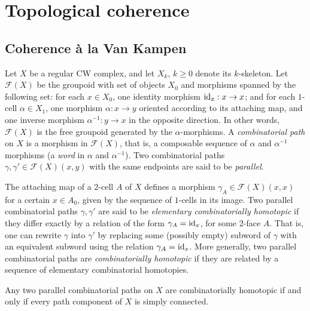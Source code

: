 
\section{Topological coherence} 
\label{s:polycoherence}

\subsection{Coherence \`a la Van Kampen}

Let $X$ be a regular CW complex, and let $X_k$, $k\geq 0$ denote its $k$-skeleton. 
Let $\mathcal{F}(X)$ be the groupoid with set of objects $X_0$ and morphisms spanned by the following set: for each $x \in X_0$, one identity morphism $\mathrm{id}_x : x \to x$; and for each $1$-cell $\alpha \in X_1$, one morphism $\alpha : x \to y$ oriented according to its attaching map, and one inverse morphism $\alpha^{-1} : y \to x$ in the opposite direction. 
In other words, $\mathcal{F}(X)$ is the free groupoid generated by the $\alpha$-morphisms. 
A \emph{combinatorial path} on $X$ is a morphism in $\mathcal{F}(X)$, that is, a composable sequence of $\alpha$ and $\alpha^{-1}$ morphisms (a \emph{word} in $\alpha$ and $\alpha^{-1}$).
Two combinatorial paths $\gamma, \gamma' \in \mathcal{F}(X)(x,y)$ with the same endpoints are said to be \emph{parallel}.

The attaching map of a $2$-cell $A$ of $X$ defines a morphism $\gamma_A \in \mathcal{F}(X)(x,x)$ for a certain $x \in A_0$, given by the sequence of $1$-cells in its image.  
Two parallel combinatorial paths $\gamma, \gamma'$ are said to be \emph{elementary combinatorially homotopic} if they differ exactly by a relation of the form $\gamma_A = \mathrm{id}_x$, for some $2$-face $A$.
That is, one can rewrite $\gamma$ into $\gamma'$ by replacing some (possibly empty) subword of $\gamma$ with an equivalent subword using the relation $\gamma_A = \mathrm{id}_x$.
More generally, two parallel combinatorial paths are \emph{combinatorially homotopic} if they are related by a sequence of elementary combinatorial homotopies.


\begin{thm}
\label{thm:top-coherence}
    Any two parallel combinatorial paths on $X$ are combinatorially homotopic if and only if every path component of $X$ is simply connected.
\end{thm}

